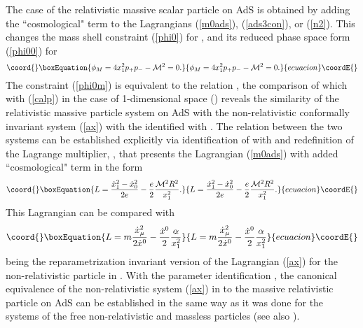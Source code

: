 \documentclass[a4paper,12pt]{article}
\def\P{\mathfrak P}
\def\J{\mathfrak J}
\begin{document}
The case of the relativistic massive scalar particle
on AdS\coordHE{} is obtained by adding
the ``cosmological" term \coordHE{}
to the Lagrangians (\ref{m0ads}),
(\ref{ads3con}), or (\ref{n2}).
This changes the mass shell constraint
(\ref{phi0}) for \myHighlight{$\phi_M=\P^2+{\cal M}^2=0$}\coordHE{}, and its reduced
phase
space  form
(\ref{phi00}) for
\begin{equation}\coord{}\boxEquation{
\phi_M=4x_1^2p_+p_--{\cal M}^2=0.
\label{phi0m}
}{
\phi_M=4x_1^2p_+p_--{\cal M}^2=0.
}{ecuacion}\coordE{}\end{equation}
The constraint (\ref{phi0m}) is equivalent to the
relation \myHighlight{$\frac{1}{2}\J_{AB}\J^{AB}=R^2{\cal M}^2$}\coordHE{},
the comparison of which with (\ref{calp}) in the case
of 1-dimensional space (\coordHE{})
reveals the similarity of the relativistic
massive particle system on AdS\coordHE{} with
the non-relativistic conformally invariant
system (\ref{ax}) with the
\coordHE{} identified with \coordHE{}.
The relation between the two systems
can be established explicitly
via identification of  \coordHE{} with
\coordHE{} and
redefinition of the Lagrange multiplier,
\coordHE{},
that presents the Lagrangian (\ref{m0ads}) with added
``cosmological" term in the form
\begin{equation}\coord{}\boxEquation{
L=\frac{\dot{x}_1^2-\dot{x}_0^2}{2e}
-\frac{e}{2}\frac{{\cal M}^2R^2}{x_1^2}.
\label{lagmasads}
}{
L=\frac{\dot{x}_1^2-\dot{x}_0^2}{2e}
-\frac{e}{2}\frac{{\cal M}^2R^2}{x_1^2}.
}{ecuacion}\coordE{}\end{equation}
This Lagrangian can be compared with
\begin{equation}\coord{}\boxEquation{
L=m\frac{\dot{x}_\mu^2}{2\dot{x}{}^0}
-\frac{\dot{x}{}^0}{2}\frac{\alpha}{x_1^2}
\label{repar2}
}{
L=m\frac{\dot{x}_\mu^2}{2\dot{x}{}^0}
-\frac{\dot{x}{}^0}{2}\frac{\alpha}{x_1^2}
}{ecuacion}\coordE{}\end{equation}
being the reparametrization invariant version
of the Lagrangian (\ref{ax})
for the non-relativistic particle in \coordHE{}.
With the parameter identification
\coordHE{},
the canonical equivalence of the non-relativistic
system (\ref{ax}) in \coordHE{} to the
massive relativistic particle on AdS\coordHE{}
can be established in the same way as it was done for the
systems of
the free non-relativistic and massless
particles (see also \cite{Bell}).
\end{document}
